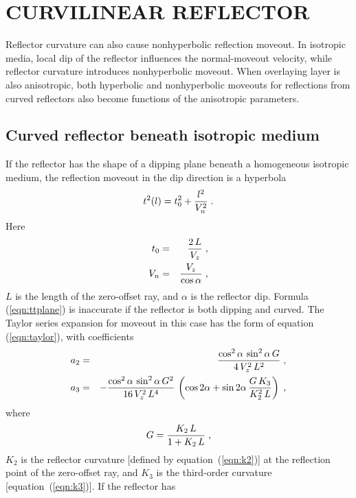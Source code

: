\section{CURVILINEAR REFLECTOR}

Reflector curvature can also cause nonhyperbolic reflection moveout. 
In isotropic media, local dip of the reflector influences the normal-moveout velocity, while reflector 
curvature introduces nonhyperbolic moveout. When overlaying layer is also anisotropic, both hyperbolic and nonhyperbolic moveouts for reflections from curved reflectors also become 
functions of the anisotropic parameters.

\subsection{Curved reflector beneath isotropic medium}
If the reflector has the shape of a dipping plane beneath a homogeneous
isotropic medium, the reflection moveout in the dip direction is a hyperbola 
\cite[]{GEO36-03-05100516}
\begin{equation}
t^2(l) = t_0^2 + {l^2 \over V_n^2}\;.
\label{eqn:ttplane}
\end{equation}
Here 
\begin{eqnarray}
t_0 & = & {{2\,L} \over V_z}\;,
\label{eqn:t0plane} \\
V_n & = & {{V_z} \over {\cos{\alpha}}}\;, 
\label{eqn:vnplane}
\end{eqnarray}
$L$ is the length of the zero-offset ray, and $\alpha$ is the
reflector dip. Formula (\ref{eqn:ttplane}) is inaccurate if the
reflector is both dipping and curved. The Taylor series expansion for
moveout in this case has the form of equation
(\ref{eqn:taylor}), with coefficients \cite[]{fomel}
\begin{eqnarray}
a_2 & = & {{\cos^2{\alpha}\,\sin^2{\alpha}\,G} 
\over {4\,V_z^2\,L^2}}\;,
\label{eqn:a2plane} \\
a_3 & = & - {{\cos^2{\alpha}\,\sin^2{\alpha}\,G^2} 
\over {16\,V_z^2\,L^4}}\,\left(\cos{2 \alpha} + \sin{2 \alpha}\,
{{G\,K_3} \over {K_2^2\,L}}\right)\;,
\label{eqn:a3plane}
\end{eqnarray}
where 
\begin{equation}
G={{K_2\,L} \over {1 + K_2\,L}}\;,
\label{eqn:g}
\end{equation}
$K_2$ is the reflector curvature [defined by equation~(\ref{eqn:k2})]
at the reflection point of the zero-offset ray, and $K_3$ is the
third-order curvature [equation~(\ref{eqn:k3})]. If the reflector has
